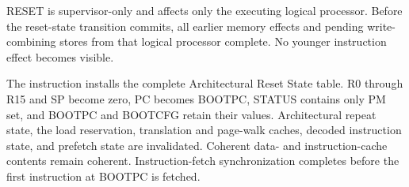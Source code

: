 RESET is supervisor-only and affects only the executing logical processor. Before the reset-state transition commits,
all earlier memory effects and pending write-combining stores from that logical processor complete. No younger
instruction effect becomes visible.

The instruction installs the complete Architectural Reset State table. R0 through R15 and SP become zero, PC becomes
BOOTPC, STATUS contains only PM set, and BOOTPC and BOOTCFG retain their values. Architectural repeat state, the load
reservation, translation and page-walk caches, decoded instruction state, and prefetch state are invalidated.
Coherent data- and instruction-cache contents remain coherent. Instruction-fetch synchronization completes before the
first instruction at BOOTPC is fetched.

